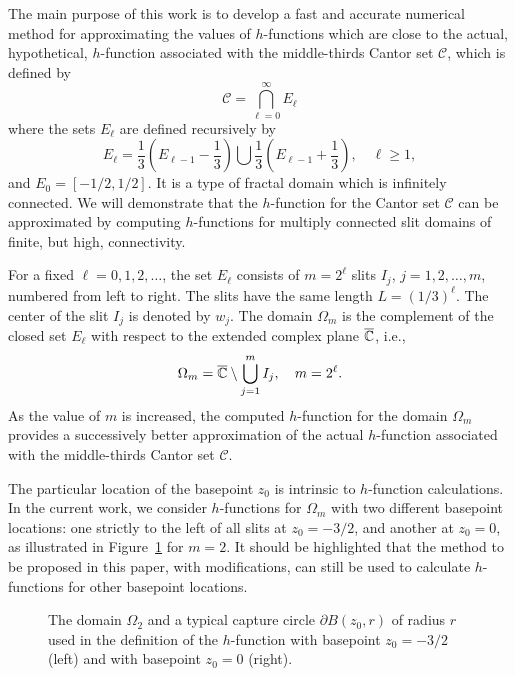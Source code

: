 The main purpose of this work is to develop a fast and accurate numerical method for approximating the values of $h$-functions which are close to the actual, hypothetical, $h$-function associated with the middle-thirds Cantor set $\mathcal{C}$, which is defined by
\begin{equation}\label{eq:E}
\mathcal{C}=\bigcap_{\ell=0}^{\infty} E_\ell
\end{equation}
where the sets $E_\ell$ are defined recursively by
\begin{equation}\label{eq:Ek}
E_\ell=\frac{1}{3}\left(E_{\ell-1}-\frac{1}{3}\right)\bigcup\frac{1}{3}\left(E_{\ell-1}+\frac{1}{3}\right), \quad \ell\ge 1,
\end{equation}
and $E_0=[-1/2,1/2]$. It is a type of fractal domain which is infinitely connected. We will demonstrate that the $h$-function for the Cantor set $\mathcal{C}$ can be approximated by computing $h$-functions for multiply connected slit domains of finite, but high, connectivity.
 
For a fixed $\ell=0,1,2,\ldots$, the set $E_\ell$ consists of $m = 2^\ell$ slits $I_{j}$, $j = 1, 2, \ldots, m$, numbered from left to right.  The slits have the same length $L = (1/3)^\ell$.
The center of the slit $I_{j}$ is denoted by $w_{j}$.
The domain $\Omega_m$ is the complement of the closed set $E_\ell$ with respect to the extended complex plane $\overline{{\mathbb C}}$, i.e.,
\begin{equation}\label{eq:Omeg-m}
	\Omega_m = \overline{{\mathbb C}}\setminus\bigcup_{j=1}^{m} I_j, \quad m=2^\ell.
\end{equation}
As the value of $m$ is increased, the computed $h$-function for the domain $\Omega_m$ provides a successively better approximation of the actual $h$-function associated with the middle-thirds Cantor set $\mathcal{C}$.

The particular location of the basepoint $z_0$ is intrinsic to $h$-function calculations. In the current work, we consider $h$-functions for $\Omega_m$ with two different basepoint locations: one strictly to the left of all slits at $z_0=-3/2$, and another at $z_0=0$, as illustrated in Figure~\ref{fig:h30} for $m=2$. 
It should be highlighted that the method to be proposed in this paper, with modifications, can still be used to calculate $h$-functions for other basepoint locations.


\begin{figure}[ht] %
	\centerline{\hfill
		\hfill
		\hfill
	}
	\caption{The domain $\Omega_2$ and a typical capture circle $\partial B(z_0,r)$ of radius $r$ used in the definition of the $h$-function with basepoint $z_0=-3/2$ (left) and with basepoint $z_0=0$ (right).}
	\label{fig:h30}
\end{figure}

